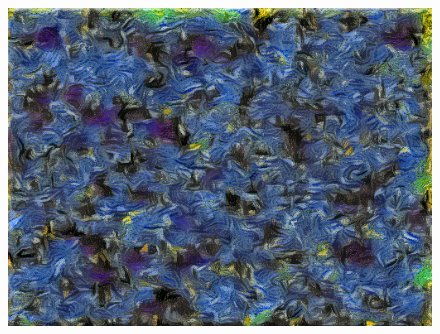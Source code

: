 \documentclass{article}
\begin{document}
\begin{figure}[htp]
\begin{minipage}{0.3\linewidth}
    \includegraphics[width=\textwidth]{img/style/block3_conv1}
    \end{minipage}

\medskip


\end{figure}
\end{document}

